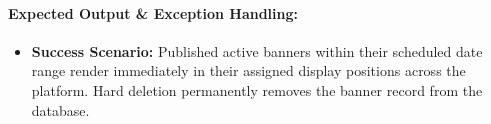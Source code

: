 \paragraph{Expected Output \& Exception Handling:}
\begin{itemize}[leftmargin=1.5em,itemsep=2pt]
  \item \textbf{Success Scenario:} Published active banners within their scheduled date range render immediately in their assigned display positions across the platform. Hard deletion permanently removes the banner record from the database.
\end{itemize}
